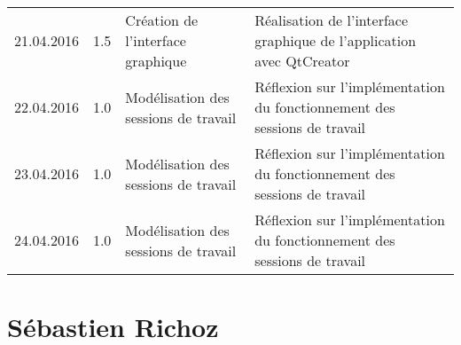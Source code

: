 \documentclass[french]{article}
\begin{document}
\begin{longtable}{p{}|p{}|p{}|p{}}
		\hline
		21.04.2016 & 1.5 & Création de l'interface graphique & Réalisation de l'interface graphique de l'application avec QtCreator\\
		22.04.2016 & 1.0 & Modélisation des sessions de travail & Réflexion sur l'implémentation du fonctionnement des sessions de travail\\
		23.04.2016 & 1.0 & Modélisation des sessions de travail & Réflexion sur l'implémentation du fonctionnement des sessions de travail\\
		24.04.2016 & 1.0 & Modélisation des sessions de travail & Réflexion sur l'implémentation du fonctionnement des sessions de travail\\
		
		
	\end{longtable}
	
	\section*{Sébastien Richoz}
\end{document}

